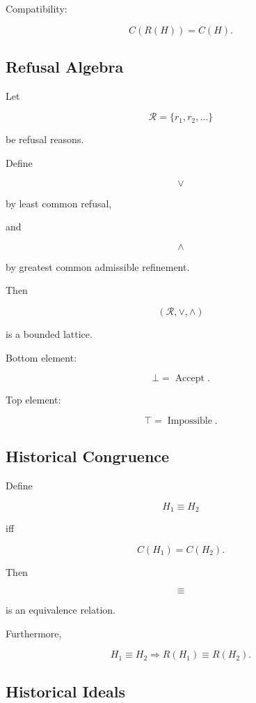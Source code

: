 \documentclass[12pt,oneside]{article}
\theoremstyle{definition}
\theoremstyle{remark}
\begin{document}
Compatibility:

\[
C(R(H))
=
C(H).
\]

\subsection*{Refusal Algebra}

Let

\[
\mathcal R
=
\{
r_1,r_2,\ldots
\}
\]

be refusal reasons.

Define

\[
\vee
\]

by least common refusal,

and

\[
\wedge
\]

by greatest common admissible refinement.

Then

\[
(\mathcal R,\vee,\wedge)
\]

is a bounded lattice.

Bottom element:

\[
\bot
=
\operatorname{Accept}.
\]

Top element:

\[
\top
=
\operatorname{Impossible}.
\]

\subsection*{Historical Congruence}

Define

\[
H_1
\equiv
H_2
\]

iff

\[
C(H_1)
=
C(H_2).
\]

Then

\[
\equiv
\]

is an equivalence relation.

Furthermore,

\[
H_1
\equiv
H_2
\Longrightarrow
R(H_1)
\equiv
R(H_2).
\]

\subsection*{Historical Ideals}
\end{document}
